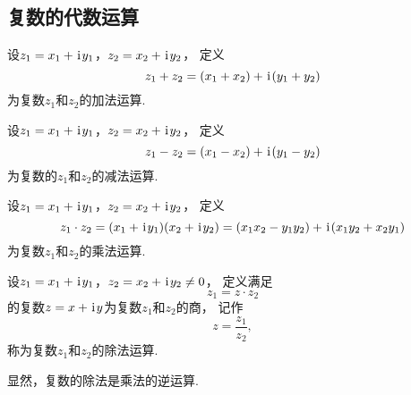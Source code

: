 \subsection{复数的代数运算}
\begin{definition}%
设\(z_1=x_1+\kern1pt\mathrm{i}\kern1pt y_1\)，\(z_2=x_2+\kern1pt\mathrm{i}\kern1pt y_2\)，
定义\begin{equation*}
	z_1+z_2=(x_1+x_2)+\kern1pt\mathrm{i}\kern1pt(y_1+y_2)
\end{equation*}为复数\(z_1\)和\(z_2\)的加法运算.
\end{definition}

\begin{definition}%
设\(z_1=x_1+\kern1pt\mathrm{i}\kern1pt y_1\)，\(z_2=x_2+\kern1pt\mathrm{i}\kern1pt y_2\)，
定义\begin{equation*}
	z_1-z_2=(x_1-x_2)+\kern1pt\mathrm{i}\kern1pt(y_1-y_2)
\end{equation*}为复数的\(z_1\)和\(z_2\)的减法运算.
\end{definition}

\begin{definition}%
设\(z_1 = x_1 + \kern1pt\mathrm{i}\kern1pt y_1\)，\(z_2 = x_2 + \kern1pt\mathrm{i}\kern1pt y_2\)，
定义\begin{equation*}
	z_1 \cdot z_2
	= (x_1 + \kern1pt\mathrm{i}\kern1pt y_1)(x_2 + \kern1pt\mathrm{i}\kern1pt y_2)
	= (x_1 x_2 - y_1 y_2)+\kern1pt\mathrm{i}\kern1pt(x_1 y_2 + x_2 y_1)
\end{equation*}为复数\(z_1\)和\(z_2\)的乘法运算.
\end{definition}

\begin{definition}%
设\(z_1 = x_1 + \kern1pt\mathrm{i}\kern1pt y_1\)，\(z_2 = x_2 + \kern1pt\mathrm{i}\kern1pt y_2 \neq 0\)，
定义满足\begin{equation*}
z_1 = z \cdot z_2
\end{equation*}的复数\(z = x + \kern1pt\mathrm{i}\kern1pt y\)为复数\(z_1\)和\(z_2\)的商，
记作\begin{equation*}
z = \frac{z_1}{z_2},
\end{equation*}称为复数\(z_1\)和\(z_2\)的除法运算.

显然，复数的除法是乘法的逆运算.
\end{definition}

